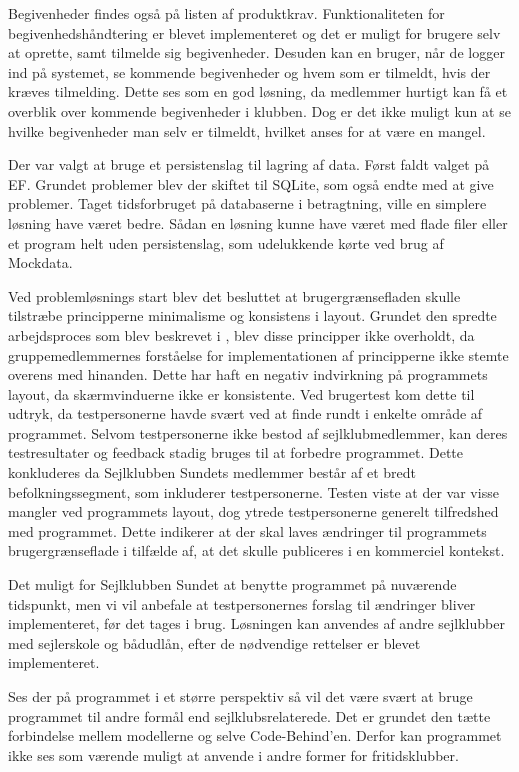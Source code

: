 Begivenheder findes også på listen af produktkrav.
Funktionaliteten for begivenhedshåndtering er blevet implementeret og det er muligt for brugere selv at oprette, samt tilmelde sig begivenheder.
Desuden kan en bruger, når de logger ind på systemet, se kommende begivenheder og hvem som er tilmeldt, hvis der kræves tilmelding. 
Dette ses som en god løsning, da medlemmer hurtigt kan få et overblik over kommende begivenheder i klubben.
Dog er det ikke muligt kun at se hvilke begivenheder man selv er tilmeldt, hvilket anses for at være en mangel. 

Der var valgt at bruge et persistenslag til lagring af data. 
Først faldt valget på \acl{EF}. 
Grundet problemer blev der skiftet til SQLite, som også endte med at give problemer. 
Taget tidsforbruget på databaserne i betragtning, ville en simplere løsning have været bedre.
Sådan en løsning kunne have været med flade filer eller et program helt uden persistenslag, som udelukkende kørte ved brug af Mockdata.  

Ved problemløsnings start blev det besluttet at brugergrænsefladen skulle tilstræbe principperne minimalisme og konsistens i layout.
Grundet den spredte arbejdsproces som blev beskrevet i , blev disse principper ikke overholdt, da gruppemedlemmernes forståelse for implementationen af principperne ikke stemte overens med hinanden.
Dette har haft en negativ indvirkning på programmets layout, da skærmvinduerne ikke er konsistente.
Ved brugertest kom dette til udtryk, da testpersonerne havde svært ved at finde rundt i enkelte område af programmet.
Selvom testpersonerne ikke bestod af sejlklubmedlemmer, kan deres testresultater og feedback stadig bruges til at forbedre programmet.
Dette konkluderes da Sejlklubben Sundets medlemmer består af et bredt befolkningssegment, som inkluderer testpersonerne.
Testen viste at der var visse mangler ved programmets layout, dog ytrede testpersonerne generelt tilfredshed med programmet.
Dette indikerer at der skal laves ændringer til programmets brugergrænseflade i tilfælde af, at det skulle publiceres i en kommerciel kontekst. 

Det muligt for Sejlklubben Sundet at benytte programmet på nuværende tidspunkt, men vi vil anbefale at testpersonernes forslag til ændringer bliver implementeret, før det tages i brug.
Løsningen kan anvendes af andre sejlklubber med sejlerskole og bådudlån, efter de nødvendige rettelser er blevet implementeret.

Ses der på programmet i et større perspektiv så vil det være svært at bruge programmet til andre formål end sejlklubsrelaterede. 
Det er grundet den tætte forbindelse mellem modellerne og selve Code-Behind'en. 
Derfor kan programmet ikke ses som værende muligt at anvende i andre former for fritidsklubber.

